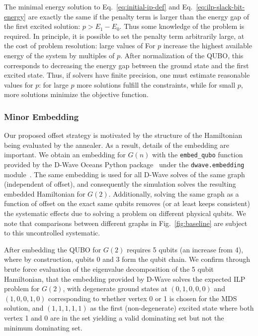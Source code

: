 \documentclass[prd,twocolumn,tightenlines,preprintnumbers,showpacs,superscriptaddress,notitlepage,nofootinbib,eqsecnum,floatfix,longbibliography,aps,10pt]{revtex4-2}
\begin{document}
The minimal energy solution to Eq.~\eqref{eq:initial-ip-def} and Eq.~\eqref{eq:ilp-slack-bit-energy} are exactly the same if the penalty term is larger than the energy gap of the first excited solution: $p > E_1 - E_0$.
Thus some knowledge of the problem is required.
In principle, it is possible to set the penalty term arbitrarily large, at the cost of problem resolution: large values of For $p$ increase the highest available energy of the system by multiples of $p$.
After normalization of the QUBO, this corresponds to decreasing the energy gap between the ground state and the first excited state.
Thus, if solvers have finite precision, one must estimate reasonable values for $p$: for large $p$ more solutions fulfill the constraints, while for small $p$, more solutions minimize the objective function.

\subsubsection{Minor Embedding}
\label{sec:methods:minor_embedding}
Our proposed offset strategy is motivated by the structure of the Hamiltonian being evaluated by the annealer.
As a result, details of the embedding are important. We obtain an embedding for $G(n)$ with the \texttt{embed\_qubo} function provided by the D-Wave Oceans Python package~\cite{dwave_oceans} under the \texttt{dwave.embedding} module~\cite{2008arXiv0804.4884C}.
The same embedding is used for all D-Wave solves of the same graph (independent of offset), and consequently the simulation solves the resulting embedded Hamiltonian for $G(2)$.
Additionally, solving the same graph as a function of offset on the exact same qubits removes (or at least keeps consistent) the systematic effects due to solving a problem on different physical qubits.
We note that comparisons between different graphs in Fig.~\ref{fig:baseline} are subject to this uncontrolled systematic.

After embedding the QUBO for $G(2)$ requires 5 qubits (an increase from 4), where by construction, qubits 0 and 3 form the qubit chain.
We confirm through brute force evaluation of the eigenvalue decomposition of the 5 qubit Hamiltonian, that the embedding provided by D-Wave solves the expected ILP problem for $G(2)$, with degenerate ground states at $(0, 1, 0, 0, 0)$ and $(1, 0, 0, 1, 0)$ corresponding to whether vertex 0 or 1 is chosen for the MDS solution, and $(1, 1, 1, 1, 1)$ as the first (non-degenerate) excited state where both vertex 1 and 0 are in the set yielding a valid dominating set but not the minimum dominating set.
\end{document}
